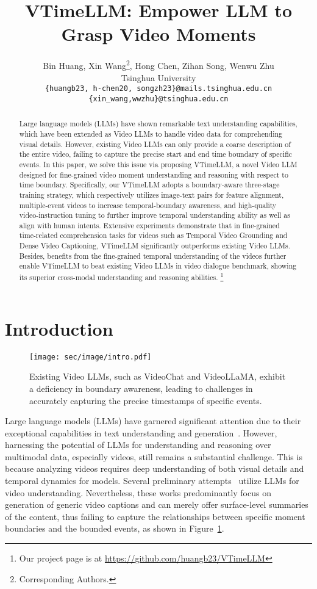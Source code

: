 \documentclass[10pt,twocolumn,letterpaper]{article}
\title{VTimeLLM: Empower LLM to Grasp Video Moments}
\author{Bin Huang, Xin Wang\thanks{Corresponding Authors.}, Hong Chen, Zihan Song, Wenwu Zhu\footnotemark[1]\\
Tsinghua University\\
{\tt\small \{huangb23, h-chen20, songzh23\}@mails.tsinghua.edu.cn} \\
{\tt\small \{xin\_wang,wwzhu\}@tsinghua.edu.cn}
}
\begin{document}
\maketitle
\begin{abstract}
Large language models (LLMs) have shown remarkable text understanding capabilities, which have been extended as Video LLMs to handle video data for comprehending visual details. 
However, existing Video LLMs can only provide a coarse description of the entire video, failing to capture the precise start and end time boundary of specific events. 
In this paper, we solve this issue via proposing VTimeLLM, a novel Video LLM designed for fine-grained video moment understanding and reasoning with respect to time boundary. 
Specifically, our VTimeLLM adopts a boundary-aware three-stage training strategy, which respectively utilizes image-text pairs for feature alignment, multiple-event videos to increase temporal-boundary awareness, and high-quality video-instruction tuning to further improve temporal understanding ability as well as align with human intents. Extensive experiments demonstrate that in fine-grained time-related comprehension tasks for videos such as Temporal Video Grounding and Dense Video Captioning, VTimeLLM significantly outperforms existing Video LLMs. Besides, benefits from the fine-grained temporal understanding of the videos further enable VTimeLLM to beat existing Video LLMs in video dialogue benchmark, showing its superior cross-modal understanding and reasoning abilities. \footnote{Our project page is at \url{https://github.com/huangb23/VTimeLLM}}
\end{abstract} \section{Introduction}
\label{sec:intro}


\begin{figure}[htbp]
  \centering
  \texttt{[image: sec/image/intro.pdf]}
  \caption{Existing Video LLMs, such as VideoChat and VideoLLaMA, exhibit a deficiency in boundary awareness, leading to challenges in accurately capturing the precise timestamps of specific events.}
  \label{fig:intro}
\end{figure}


Large language models (LLMs) have garnered significant attention due to their exceptional capabilities in text understanding and generation~\cite{zeng2022glm, touvron2023llama2}. However, harnessing the potential of LLMs for understanding and reasoning over multimodal data, especially videos, still remains a substantial challenge. This is because analyzing videos requires deep understanding of both visual details and temporal dynamics for models. 
Several preliminary attempts~\cite{li2023videochat, maaz2023videochatgpt, zhang2023videollama} utilize LLMs for video understanding. Nevertheless, these works predominantly focus on generation of generic video captions and can merely offer surface-level summaries of the content, thus failing to capture the relationships between specific moment boundaries and the bounded events, as shown in Figure~\ref{fig:intro}. 
\end{document}
